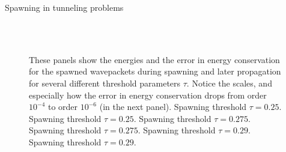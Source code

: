 \begin{chapter}{Spawning in tunneling problems}
\begin{figure}[h!]
{  } \\
   \\
  \caption[Energies and energy drift of the spawned wavepackets during spawning and later propagation]{
  These panels show the energies and the error in energy conservation for the spawned wavepackets
  during spawning and later propagation for several different threshold parameters $\tau$.
  Notice the scales, and especially how the error in energy conservation drops from order $10^{-4}$
  to order $10^{-6}$ (in the next panel).
   Spawning threshold $\tau = 0.25$.
   Spawning threshold $\tau = 0.25$.
   Spawning threshold $\tau = 0.275$.
   Spawning threshold $\tau = 0.275$.
   Spawning threshold $\tau = 0.29$.
   Spawning threshold $\tau = 0.29$.
  \label{fig:spawn_propag_K100_spawn_threshold_energies_spawn1}
  }
\end{figure}



\end{chapter}
